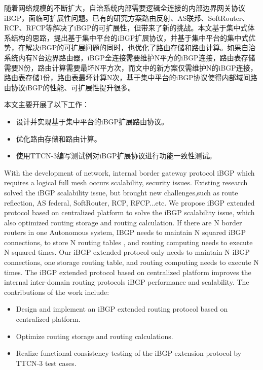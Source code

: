 \begin{cabstract}
  随着网络规模的不断扩大，自治系统内部需要逻辑全连接的内部边界网关协议iBGP，面临可扩展性问题。已有的研究方案路由反射、AS联邦、SoftRouter、RCP、RFCP等解决了iBGP的可扩展性，但带来了新的挑战。本文基于集中式体系结构的思路，提出基于集中平台的iBGP扩展协议，并基于集中平台的集中式优势，在解决iBGP的可扩展问题的同时，也优化了路由存储和路由计算。如果自治系统内有N台边界路由器，iBGP全连接需要维护N平方的iBGP连接，路由表存储需要N份，路由计算需要最坏N平方次，而文中的新方案仅需维护N的iBGP连接，路由表存储1份，路由表最坏计算N次，基于集中平台的iBGP协议使得内部域间路由协议iBGP的性能、可扩展性提升很多。

  本文主要开展了以下工作：
  \begin{itemize}
    \item 设计并实现基于集中平台的iBGP扩展路由协议。
    \item 优化路由存储和路由计算。
    \item 使用TTCN-3编写测试例对iBGP扩展协议进行功能一致性测试。
  \end{itemize}

\end{cabstract}


\begin{eabstract}
   With the development of network, internal border gateway protocol iBGP which requires a logical full mesh occurs scalability, security issues. Existing research solved the iBGP scalability issue, but brought new challenges,such as route reflection, AS federal, SoftRouter, RCP, RFCP...etc. We propose iBGP extended protocol based on centralized platform to solve the iBGP scalability issue, which also optimized routing storage and routing calculation. If there are N border routers in one Autonomous system, IBGP needs to maintain N squared iBGP connections, to store N routing tables , and routing computing needs to execute N squared times. Our iBGP extended protocol only needs to maintain N iBGP connections, one storage routing table, and routing computing needs to execute N times. The iBGP extended protocol based on centralized platform improves the internal inter-domain routing protocols iBGP performance and scalability. The contributions of the work include:
   
   \begin{itemize}
    \item Design and implement an iBGP extended routing protocol based on centralized platform.
    \item Optimize routing storage and routing calculations.
    \item Realize functional consistency testing of the iBGP extension protocol by TTCN-3 test cases.
  \end{itemize}
   
   
   
\end{eabstract}




